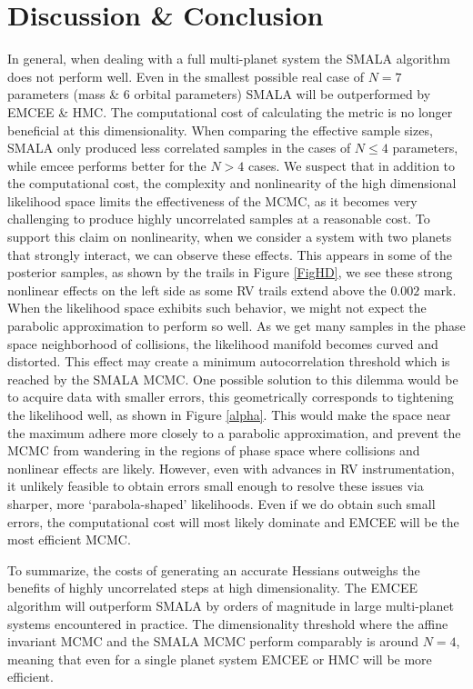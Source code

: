 \documentclass{aa}
\begin{document}
\section{Discussion \& Conclusion}
In general, when dealing with a full multi-planet system the SMALA algorithm does not perform well. Even in the smallest possible real case of $N=7$ parameters (mass \& 6 orbital parameters) SMALA will be outperformed by EMCEE \& HMC. The computational cost of calculating the metric is no longer beneficial at this dimensionality. When comparing the effective sample sizes, SMALA only produced less correlated samples in the cases of $N \leq 4$ parameters, while emcee performs better for the $N>4$ cases. We suspect that in addition to the computational cost, the complexity and nonlinearity of the high dimensional likelihood space limits the effectiveness of the MCMC, as it becomes very challenging to produce highly uncorrelated samples at a reasonable cost. To support this claim on nonlinearity, when we consider a system with two planets that strongly interact, we can observe these effects. This appears in some of the posterior samples, as shown by the trails in Figure \ref{FigHD}, we see these strong nonlinear effects on the left side as some RV trails extend above the $0.002$ mark. When the likelihood space exhibits such behavior, we might not expect the parabolic approximation to perform so well. As we get many samples in the phase space neighborhood of collisions, the likelihood manifold becomes curved and distorted. This effect may create a minimum autocorrelation threshold which is reached by the SMALA MCMC. One possible solution to this dilemma would be to acquire data with smaller errors, this geometrically corresponds to tightening the likelihood well, as shown in Figure \ref{alpha}.  This would make the space near the maximum adhere more closely to a parabolic approximation, and prevent the MCMC from wandering in the regions of phase space where collisions and nonlinear effects are likely. However, even with advances in RV instrumentation, it unlikely feasible to obtain errors small enough to resolve these issues via sharper, more `parabola-shaped' likelihoods. Even if we do obtain such small errors, the computational cost will most likely dominate and EMCEE will be the most efficient MCMC.

To summarize, the costs of generating an accurate Hessians outweighs the benefits of highly uncorrelated steps at high dimensionality. The EMCEE algorithm will outperform SMALA by orders of magnitude in large multi-planet systems encountered in practice. The dimensionality threshold where the affine invariant MCMC and the SMALA MCMC perform comparably is around $N = 4$, meaning that even for a single planet system EMCEE or HMC will be more efficient.
\end{document}
